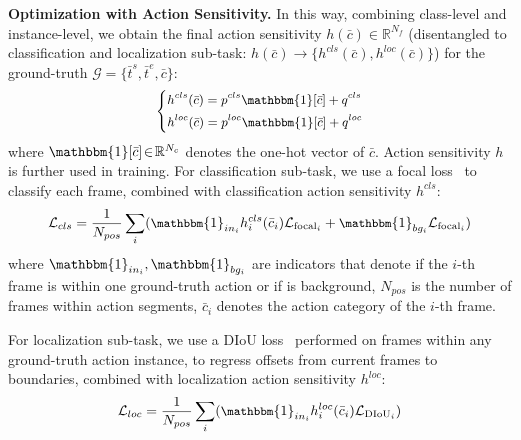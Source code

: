 \documentclass[10pt,twocolumn,letterpaper]{article}
\begin{document}
\textbf{Optimization with Action Sensitivity.} In this way, combining class-level and instance-level,  we obtain the final action sensitivity $h(\bar c) \! \in \! \mathbb{R}^{N_f}$ (disentangled to classification and localization sub-task: $h(\bar c) \rightarrow \{h^{cls}(\bar c),h^{loc}(\bar c)\}$) for the ground-truth $\mathcal{G}\!=\!\{\bar t^s, \bar t^e, \bar c\}$:
\begin{equation} \small
\left\{
\begin{aligned}
 & h^{cls}(\bar c) = p^{cls} \mathbbm{1}[\bar c] + q^{cls} \\
& h^{loc}(\bar c) = p^{loc} \mathbbm{1}[\bar c] + q^{loc}
\end{aligned}
\right.
\end{equation}
where $\mathbbm{1}[\bar c] \!\in\! \mathbb{R}^{N_c}$ denotes the one-hot vector of $\bar c$. Action sensitivity $h$ is further used in training. For classification sub-task,  we use a focal loss~\cite{lin2017focal} to classify each frame, combined with classification action sensitivity $h^{cls}$:
\begin{equation} \small \label{equ:lcls}
\mathcal{L}_{cls}= \frac{1}{N_{pos}} \sum_i (\mathbbm{1}_{in_i} h^{cls}_i(\bar c_i) \mathcal{L}_{\text{focal}_i} 
    + \mathbbm{1}_{bg_i} \mathcal{L}_{\text{focal}_i})
\end{equation}
where $\mathbbm{1}_{in_i}, \mathbbm{1}_{bg_i}$ are indicators that denote if the $i$-th frame is within one ground-truth action or if is background, $N_{pos}$ is the number of frames within action segments, $\bar c_i$ denotes the action category of the $i$-th frame.

For localization sub-task, we use a DIoU loss~\cite{zheng2020diou} performed on frames within any ground-truth action instance, to regress offsets from current frames to boundaries, combined with localization action sensitivity $h^{loc}$:
\begin{equation} \small \label{equ:lloc}
\mathcal{L}_{loc}= \frac{1}{N_{pos}} \sum_i (\mathbbm{1}_{in_i} h^{loc}_i(\bar c_i) \mathcal{L}_{\text{DIoU}_i})
\end{equation}
\end{document}
